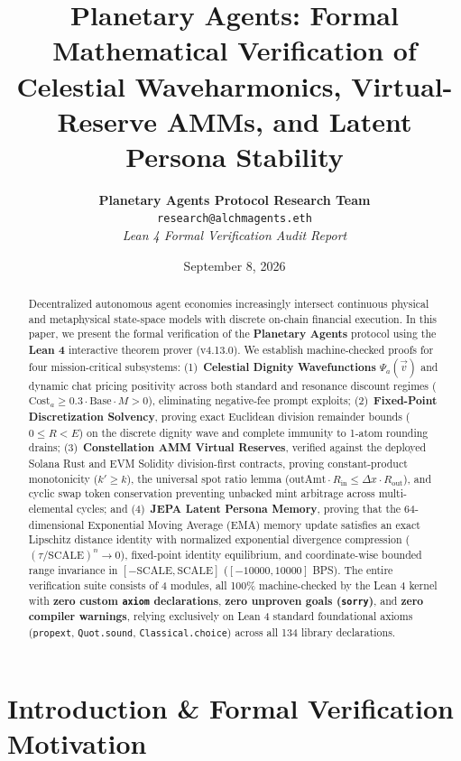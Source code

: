 \documentclass[11pt,a4paper]{article}
\title{\textbf{Planetary Agents: Formal Mathematical Verification of Celestial Waveharmonics, Virtual-Reserve AMMs, and Latent Persona Stability}}
\author{
  \textbf{Planetary Agents Protocol Research Team} \\
  \texttt{research@alchmagents.eth} \\
  \textit{Lean 4 Formal Verification Audit Report}
}
\date{September 8, 2026}
\theoremstyle{plain}
\theoremstyle{definition}
\theoremstyle{remark}
\begin{document}
\maketitle

\begin{abstract}
Decentralized autonomous agent economies increasingly intersect continuous physical and metaphysical state-space models with discrete on-chain financial execution. In this paper, we present the formal verification of the \textbf{Planetary Agents} protocol using the \textbf{Lean 4} interactive theorem prover (v4.13.0). We establish machine-checked proofs for four mission-critical subsystems: (1)~\textbf{Celestial Dignity Wavefunctions} $\Psi_a(\vec{v})$ and dynamic chat pricing positivity across both standard and resonance discount regimes ($\text{Cost}_a \ge 0.3 \cdot \text{Base} \cdot M > 0$), eliminating negative-fee prompt exploits; (2)~\textbf{Fixed-Point Discretization Solvency}, proving exact Euclidean division remainder bounds ($0 \le R < E$) on the discrete dignity wave and complete immunity to 1-atom rounding drains; (3)~\textbf{Constellation AMM Virtual Reserves}, verified against the deployed Solana Rust and EVM Solidity division-first contracts, proving constant-product monotonicity ($k' \ge k$), the universal spot ratio lemma ($\text{outAmt} \cdot R_{\text{in}} \le \Delta x \cdot R_{\text{out}}$), and cyclic swap token conservation preventing unbacked mint arbitrage across multi-elemental cycles; and (4)~\textbf{JEPA Latent Persona Memory}, proving that the 64-dimensional Exponential Moving Average (EMA) memory update satisfies an exact Lipschitz distance identity with normalized exponential divergence compression ($(\tau/\text{SCALE})^n \to 0$), fixed-point identity equilibrium, and coordinate-wise bounded range invariance in $[-\text{SCALE}, \text{SCALE}]$ ($[-10000, 10000]$ BPS). The entire verification suite consists of 4 modules, all 100\% machine-checked by the Lean 4 kernel with \textbf{zero custom \texttt{axiom} declarations}, \textbf{zero unproven goals (\texttt{sorry})}, and \textbf{zero compiler warnings}, relying exclusively on Lean 4 standard foundational axioms (\texttt{propext}, \texttt{Quot.sound}, \texttt{Classical.choice}) across all 134 library declarations.
\end{abstract}

\tableofcontents
\newpage

\section{Introduction \& Formal Verification Motivation}
\end{document}
